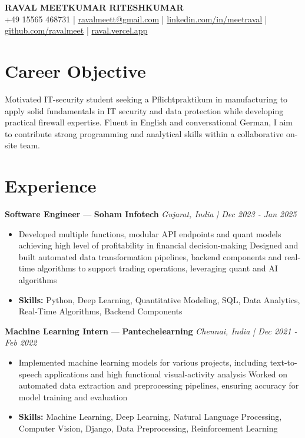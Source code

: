 \documentclass[a4paper,10pt]{article}
\begin{document}
\begin{center}
  {\Large\bfseries RAVAL MEETKUMAR RITESHKUMAR}\\[2pt]
  {\small +49 15565 468731 \;|\; \href{mailto:ravalmeett@gmail.com}{ravalmeett@gmail.com} \;|\; \href{https://www.linkedin.com/in/meetraval/}{linkedin.com/in/meetraval} \;|\; \href{https://github.com/ravalmeet}{github.com/ravalmeet} \;|\; \href{https://raval.vercel.app/}{raval.vercel.app}}
\end{center}
\vspace{-3pt}

\section*{Career Objective}
Motivated IT-security student seeking a Pflichtpraktikum in manufacturing to apply solid fundamentals in IT security and data protection while developing practical firewall expertise. Fluent in English and conversational German, I aim to contribute strong programming and analytical skills within a collaborative on-site team.\par

\section*{Experience}
\textbf{Software Engineer} — \textbf{Soham Infotech} \hfill \textit{Gujarat, India \;|\; Dec 2023 - Jan 2025}\par
\vspace{1pt}
\begin{itemize}
  \item Developed multiple functions, modular API endpoints and quant models achieving high level of profitability in financial decision-making Designed and built automated data transformation pipelines, backend components and real-time algorithms to support trading operations, leveraging quant and AI algorithms
  \item \textbf{Skills:} Python, Deep Learning, Quantitative Modeling, SQL, Data Analytics, Real-Time Algorithms, Backend Components
\end{itemize}
\vspace{3pt}
\textbf{Machine Learning Intern} — \textbf{Pantechelearning} \hfill \textit{Chennai, India \;|\; Dec 2021 - Feb 2022}\par
\vspace{1pt}
\begin{itemize}
  \item Implemented machine learning models for various projects, including text-to-speech applications and high functional visual-activity analysis Worked on automated data extraction and preprocessing pipelines, ensuring accuracy for model training and evaluation
  \item \textbf{Skills:} Machine Learning, Deep Learning, Natural Language Processing, Computer Vision, Django, Data Preprocessing, Reinforcement Learning
\end{itemize}
\end{document}

